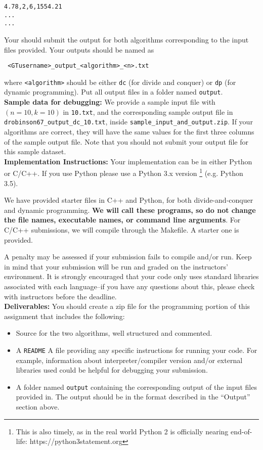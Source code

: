 \documentclass{article}
\begin{document}
\begin{verbatim}
4.78,2,6,1554.21
...
...
\end{verbatim}
Your should submit the output for both algorithms corresponding to the input
files provided. Your outputs should be named as
\begin{verbatim} <GTusername>_output_<algorithm>_<n>.txt\end{verbatim}
where \verb=<algorithm>= should be either \verb=dc= (for divide and conquer)
or \verb=dp= (for dynamic programming). Put all output files in a folder named
\verb=output=.\\

{\bf Sample data for debugging:} We provide a sample input file with $(n=10,
k=10)$ in \verb=10.txt=, and the corresponding sample output file in
\verb=drobinson67_output_dc_10.txt=, inside \verb=sample_input_and_output.zip=. If your algorithms are correct, they will
have the same values for the first three columns of the sample output file.
Note that you should not submit your output file for this sample dataset.\\

{\bf Implementation Instructions:}
Your implementation can be in either Python or C/C++. If you use Python please use a Python 3.x version \footnote{This is also timely, as in the real world Python 2 is officially nearing end-of-life: https://python3statement.org} (e.g. Python 3.5).

We have provided starter files in C++ and Python, for both divide-and-conquer and dynamic programming. {\bf We will call these programs, so do not change the file names, executable names, or command line arguments}. For C/C++ submissions, we will compile through the Makefile. A starter one is provided. 

A penalty may be assessed if your submission fails to compile and/or run. Keep in mind that your submission will be run and graded on the instructors' environment. It is strongly encouraged that your code only uses standard libraries associated with each language--if you have any questions about this, please check with instructors before the deadline.\\

{\bf Deliverables:} You should create a zip file for the programming portion
of this assignment that includes the following:
\begin{itemize}
\item Source for the two algorithms, well structured and commented. 
\item A \verb=README= A file providing any specific instructions for running your code. For example, information about interpreter/compiler version and/or external libraries used could be helpful for debugging your submission. 

\item A folder named \verb=output= containing the corresponding output of the
input files provided in. The output should be in the format described in the
``Output'' section above.
\end{itemize}
\end{document}
